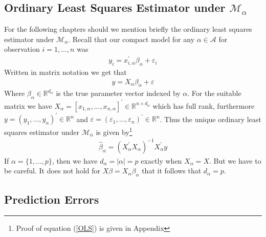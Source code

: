\documentclass[Research_Module_ES.tex]{subfiles}
\begin{document}
\subsection{Ordinary Least Squares Estimator under $\mathcal{M}_\alpha$}
For the following chapters should we mention briefly the ordinary least squares estimator under $\mathcal{M}_\alpha$. Recall that our compact model for any $\alpha\in\mathcal{A}$ for observation $i=1,...,n$ was
\begin{align*}
	y_i=x_{i,\alpha}^\prime\beta_\alpha+\varepsilon_i
\end{align*}
Written in matrix notation we get that
\begin{align}
	y=X_\alpha \beta_\alpha+\varepsilon  \label{CM_model_matrix}
\end{align}
Where $\beta_\alpha\in\mathbb{R}^{d_\alpha}$ is the true parameter vector indexed by $\alpha$. For the suitable matrix we have $X_\alpha=[x_{1,\alpha},...,x_{n,\alpha}]^\prime \in\mathbb{R}^{n\times d_\alpha}$
which has full rank, furthermore $y=(y_1,...,y_n)^\prime\in\mathbb{R}^n$ and $\varepsilon=(\varepsilon_1,...,\varepsilon_n)^\prime\in\mathbb{R}^n$. Thus the unique %
ordinary least squares estimator under $\mathcal{M}_\alpha$ is given by\footnote{Proof of equation (\ref{OLS}) is given in Appendix }
\begin{align}
	\hat{\beta}_\alpha=(X_\alpha^\prime X_\alpha)^{-1}X_\alpha^\prime y
	\label{OLS}
\end{align}
If $\alpha=\{1,...,p\}$, then we have $d_\alpha=|\alpha|=p$ exactly when $X_\alpha=X$. But we have to be careful. It does not hold for $X\beta=X_\alpha\beta_\alpha$ that it follows that $d_\alpha=p$.

\subsection{Prediction Errors}
\end{document}
